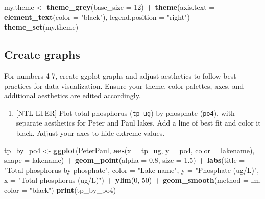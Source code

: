 \documentclass[
]{article}
\newenvironment{Shaded}{\begin{snugshade}}{\end{snugshade}}
\newcommand{\DataTypeTok}[1]{\textcolor[rgb]{0.13,0.29,0.53}{#1}}
\newcommand{\DecValTok}[1]{\textcolor[rgb]{0.00,0.00,0.81}{#1}}
\newcommand{\FloatTok}[1]{\textcolor[rgb]{0.00,0.00,0.81}{#1}}
\newcommand{\KeywordTok}[1]{\textcolor[rgb]{0.13,0.29,0.53}{\textbf{#1}}}
\newcommand{\NormalTok}[1]{#1}
\newcommand{\OperatorTok}[1]{\textcolor[rgb]{0.81,0.36,0.00}{\textbf{#1}}}
\newcommand{\StringTok}[1]{\textcolor[rgb]{0.31,0.60,0.02}{#1}}
\providecommand{\tightlist}{%
  \setlength{\itemsep}{0pt}\setlength{\parskip}{0pt}}
\begin{document}
\begin{Shaded}
\begin{Highlighting}[]
\NormalTok{my.theme <-}\StringTok{ }\KeywordTok{theme_grey}\NormalTok{(}\DataTypeTok{base_size =} \DecValTok{12}\NormalTok{) }\OperatorTok{+}
\StringTok{  }\KeywordTok{theme}\NormalTok{(}\DataTypeTok{axis.text =} \KeywordTok{element_text}\NormalTok{(}\DataTypeTok{color =} \StringTok{"black"}\NormalTok{), }
        \DataTypeTok{legend.position =} \StringTok{"right"}\NormalTok{)}
\KeywordTok{theme_set}\NormalTok{(my.theme)}
\end{Highlighting}
\end{Shaded}

\hypertarget{create-graphs}{%
\subsection{Create graphs}\label{create-graphs}}

For numbers 4-7, create ggplot graphs and adjust aesthetics to follow
best practices for data visualization. Ensure your theme, color
palettes, axes, and additional aesthetics are edited accordingly.

\begin{enumerate}
\def\labelenumi{\arabic{enumi}.}
\setcounter{enumi}{3}
\tightlist
\item
  {[}NTL-LTER{]} Plot total phosphorus (\texttt{tp\_ug}) by phosphate
  (\texttt{po4}), with separate aesthetics for Peter and Paul lakes. Add
  a line of best fit and color it black. Adjust your axes to hide
  extreme values.
\end{enumerate}

\begin{Shaded}
\begin{Highlighting}[]
\NormalTok{tp_by_po4 <-}\StringTok{ }\KeywordTok{ggplot}\NormalTok{(PeterPaul, }\KeywordTok{aes}\NormalTok{(}\DataTypeTok{x =}\NormalTok{ tp_ug, }\DataTypeTok{y =}\NormalTok{ po4, }\DataTypeTok{color =}\NormalTok{ lakename),}
                    \DataTypeTok{shape =}\NormalTok{ lakename) }\OperatorTok{+}
\StringTok{  }\KeywordTok{geom_point}\NormalTok{(}\DataTypeTok{alpha =} \FloatTok{0.8}\NormalTok{, }\DataTypeTok{size =} \FloatTok{1.5}\NormalTok{) }\OperatorTok{+}\StringTok{ }
\StringTok{  }\KeywordTok{labs}\NormalTok{(}\DataTypeTok{title =} \StringTok{"Total phosphorus by phosphate"}\NormalTok{, }\DataTypeTok{color =} \StringTok{"Lake name"}\NormalTok{,}
       \DataTypeTok{y =} \StringTok{"Phosphate (ug/L)"}\NormalTok{, }\DataTypeTok{x =} \StringTok{"Total phosphorus (ug/L)"}\NormalTok{) }\OperatorTok{+}
\StringTok{  }\KeywordTok{ylim}\NormalTok{(}\DecValTok{0}\NormalTok{, }\DecValTok{50}\NormalTok{) }\OperatorTok{+}
\StringTok{  }\KeywordTok{geom_smooth}\NormalTok{(}\DataTypeTok{method =}\NormalTok{ lm, }\DataTypeTok{color =} \StringTok{"black"}\NormalTok{)}
\KeywordTok{print}\NormalTok{(tp_by_po4) }
\end{Highlighting}
\end{Shaded}
\end{document}
